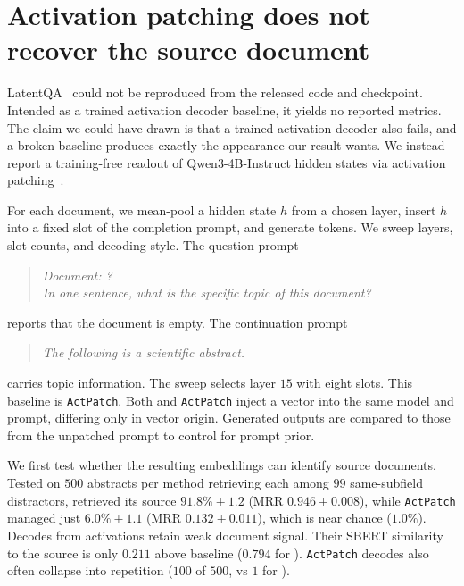 \section{Activation patching does not recover the source document}
\label{app:actpatch}

LatentQA~\citep{pan2024latentqa} could not be reproduced from the released code and checkpoint.
Intended as a trained activation decoder baseline, it yields no reported metrics.
The claim we could have drawn is that a trained activation decoder also fails, and a broken baseline produces exactly the appearance our result wants.
We instead report a training-free readout of Qwen3-4B-Instruct hidden states via activation patching~\citep{ghandeharioun2024patchscopes,chen2024selfie}.

For each document, we mean-pool a hidden state $h$ from a chosen layer, insert $h$ into a fixed slot of the completion prompt, and generate tokens.
We sweep layers, slot counts, and decoding style.
The question prompt
\begin{quote}\itshape
Document: ?\\[0.5em]
In one sentence, what is the specific topic of this document?
\end{quote}
reports that the document is empty.
The continuation prompt
\begin{quote}\itshape
The following is a scientific abstract.
\end{quote}
carries topic information.
The sweep selects layer $15$ with eight slots.
This baseline is \texttt{ActPatch}.
Both \doctolora and \texttt{ActPatch} inject a vector into the same model and prompt, differing only in vector origin.
Generated outputs are compared to those from the unpatched prompt to control for prompt prior.

We first test whether the resulting embeddings can identify source documents.
Tested on $500$ abstracts per method retrieving each among $99$ same-subfield distractors, \doctolora retrieved its source $91.8\% \pm 1.2$ (MRR $0.946 \pm 0.008$), while \texttt{ActPatch} managed just $6.0\% \pm 1.1$ (MRR $0.132 \pm 0.011$), which is near chance ($1.0\%$). 
Decodes from activations retain weak document signal. 
Their SBERT similarity to the source is only $0.211$ above baseline ($0.794$ for \doctolora). 
\texttt{ActPatch} decodes also often collapse into repetition ($100$ of $500$, vs $1$ for \doctolora).

